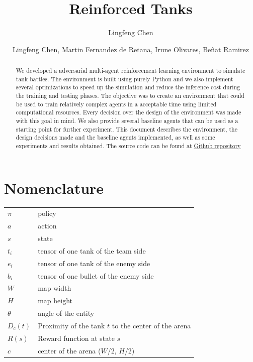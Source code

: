 \documentclass[conf]{new-aiaa}
\title{Reinforced Tanks}
\author{Lingfeng Chen}
\author{Lingfeng Chen, Martin Fernandez de Retana, Irune Olivares, Beñat Ramirez}
\begin{document}
\maketitle

\begin{abstract}
We developed a adversarial multi-agent reinforcement learning environment to simulate tank battles. The environment is built using purely Python and we also implement several optimizations to speed up the simulation and reduce the inference cost during the training and testing phases. The objective was to create an environment that could be used to train relatively complex agents in a acceptable time using limited computational resources. Every decision over the design of the environment was made with this goal in mind. We also provide several baseline agents that can be used as a starting point for further experiment. This document describes the environment, the design decisions made and the baseline agents implemented, as well as some experiments and results obtained. The source code can be found at \href{https://github.com/Lingfeng555/ReinforcedTanks}{Github repository}
\end{abstract}

\section{Nomenclature}

{\renewcommand\arraystretch{1.0}
\noindent\begin{longtable*}{@{}l @{\quad=\quad} l@{}}
$\pi$  & policy \\
$a$ &    action \\
$s$& state \\
$t_i$ & tensor of one tank of the team side \\
$e_i$ & tensor of one tank of the enemy side \\
$b_i$ & tensor of one bullet of the enemy side \\
$W$   & map width \\
$H$ & map height \\
$\theta$ & angle of the entity \\
$D_c(t)$ & Proximity of the tank $t$ to the center of the arena \\
$R(s)$ & Reward function at state $s$ \\
$c$ & center of the arena ($W$/2, $H$/2) \\
\end{longtable*}}
\end{document}
